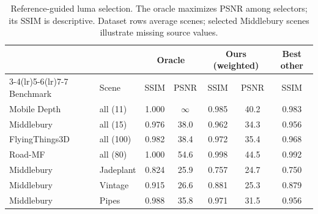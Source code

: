 \begin{table}[htbp]
\centering
\scriptsize
\setlength{\tabcolsep}{4pt}
\caption{Reference-guided luma selection. The oracle maximizes PSNR among selectors; its SSIM is descriptive. Dataset rows average scenes; selected Middlebury scenes illustrate missing source values.}
\label{tab:supp_oracle}
\begin{tabular}{llccccc}
\toprule
 & & \multicolumn{2}{c}{Oracle} & \multicolumn{2}{c}{Ours (weighted)} & Best other \\
\cmidrule(lr){3-4}\cmidrule(lr){5-6}\cmidrule(lr){7-7}
Benchmark & Scene & SSIM & PSNR & SSIM & PSNR & SSIM \\
\midrule
Mobile Depth & all (11) & 1.000 & $\infty$ & 0.985 & 40.2 & 0.983 \\
Middlebury & all (15) & 0.976 & 38.0 & 0.962 & 34.3 & 0.956 \\
FlyingThings3D & all (100) & 0.982 & 38.4 & 0.972 & 35.4 & 0.968 \\
Road-MF & all (80) & 1.000 & 54.6 & 0.998 & 44.5 & 0.992 \\
\midrule
Middlebury & Jadeplant & 0.824 & 25.9 & 0.757 & 24.7 & 0.750 \\
Middlebury & Vintage & 0.915 & 26.6 & 0.881 & 25.3 & 0.879 \\
Middlebury & Pipes & 0.988 & 35.8 & 0.971 & 31.5 & 0.956 \\
\bottomrule
\end{tabular}
\end{table}
